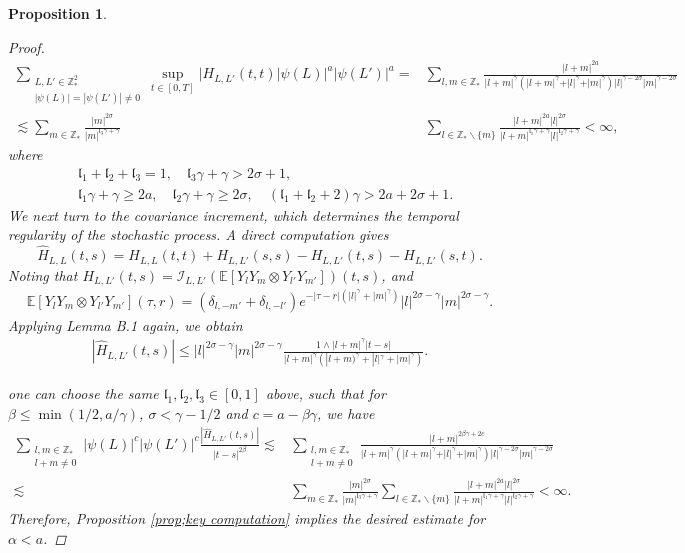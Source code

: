 \documentclass{article}
\newtheorem{proposition}{Proposition}[section]
\numberwithin{equation}{section}
\newcommand{\m}{\mathbb}
\newcommand{\ml}{\mathcal}
\newcommand{\mk}{\mathfrak}
\begin{document}
\begin{proposition}
\begin{proof}
      \begin{align*}
   	\sum_{\substack{L,L'\in\m Z^2_*\\|\psi(L)|=|\psi(L')|\neq0}}\sup_{t\in[0,T]}\vert H_{L,L'}(t,t)\vert\psi(L)\vert^a\vert \psi(L')\vert^a=&\sum_{l,m\in\m Z_*}\frac{\vert l+m\vert^{2a}}{\vert l+m\vert^\gamma(\vert l+m\vert^\gamma+\vert l\vert^\gamma+\vert m\vert^\gamma)|l|^{\gamma-2\sigma}|m|^{\gamma-2\sigma}}\\
   	\lesssim\sum_{m\in\m Z_*}\frac{|m|^{2\sigma}}{|m|^{\mk l_3\gamma+\gamma}}&\sum_{l\in\m Z_*\backslash\{m\}}\frac{|l+m|^{2a}|l|^{2\sigma}}{|l+m|^{\mk l_1\gamma+\gamma}|l|^{\mk l_2\gamma+\gamma}}<\infty,
   \end{align*}
    where 
    \begin{align*}
       & \mk l_1+\mk l_2+\mk l_3=1,\quad  \mk l_3\gamma+\gamma> 2\sigma+1,\\
       & \mk l_1\gamma+\gamma \geq 2a,\quad\mk l_2\gamma+\gamma\geq 2\sigma,\quad (\mk l_1+\mk l_2+2)\gamma>2a+2\sigma+1. 
    \end{align*}
 We next turn to the covariance increment, which determines the temporal regularity of the stochastic process. A direct computation gives
   \begin{equation}\label{eq;relation;H}
   	\hat H_{L,L}(t,s)=H_{L,L}(t,t)+H_{L,L'}(s,s)-H_{L,L'}(t,s)-H_{L,L'}(s,t).
   \end{equation}
Noting that $H_{L,L'}(t,s)=\ml I_{L,L'}(\m E[Y_{l}Y_m\otimes Y_{l'}Y_{m'}])(t,s)$, and 
\begin{align*}
    \m E[Y_lY_m\otimes Y_{l'}Y_{m'}](\tau,r)=(\delta_{l,-m'}+\delta_{l,-l'})e^{-|\tau-r|(|l|^\gamma+|m|^\gamma)}|l|^{2\sigma-\gamma}|m|^{2\sigma-\gamma}.
\end{align*}
Applying Lemma B.1 again, we obtain
  \begin{align*}
      |\widehat H_{L,L'}(t,s)|\leq |l|^{2\sigma-\gamma}|m|^{2\sigma-\gamma}\frac{1\wedge |l+m|^\gamma |t-s|}{|l+m|^\gamma(|l+m)^\gamma+|l|^\gamma+|m|^\gamma)}.
  \end{align*}
  
   one can choose the same $\mk l_1,\mk l_2,\mk l_3\in[0,1]$ above, such that for $\beta\leq \min (1/2,a/\gamma)$, $\sigma<\gamma-1/2$ and $c= a-\beta\gamma$, we have
   	\begin{align*}
   		\sum_{\substack{l,m\in\m Z_*\\ l+m\neq 0}}|\psi(L)|^c|\psi(L')|^c\frac{ |\widehat H_{L,L'}(t,s)|}{\vert t-s\vert^{2\beta}}
   		\lesssim &\sum_{\substack{l,m\in\m Z_*\\ l+m\neq 0}}\frac{|l+m|^{2\beta\gamma+2c}}{\vert l+m\vert^\gamma(\vert l+m\vert^\gamma+\vert l\vert^\gamma+\vert m\vert^\gamma)|l|^{\gamma-2\sigma}|m|^{\gamma-2\sigma}}\\
   	\lesssim&\sum_{m\in\m Z_*}\frac{|m|^{2\sigma}}{|m|^{\mk l_3\gamma+\gamma}}\sum_{l\in\m Z_*\backslash\{m\}}\frac{|l+m|^{2a}|l|^{2\sigma}}{|l+m|^{\mk l_1\gamma+\gamma}|l|^{\mk l_2\gamma+\gamma}}<\infty.
    \end{align*}
   Therefore, Proposition \ref{prop;key computation} implies the desired estimate for $\alpha<a$.
	\end{proof}
\end{proposition}
\end{document}
